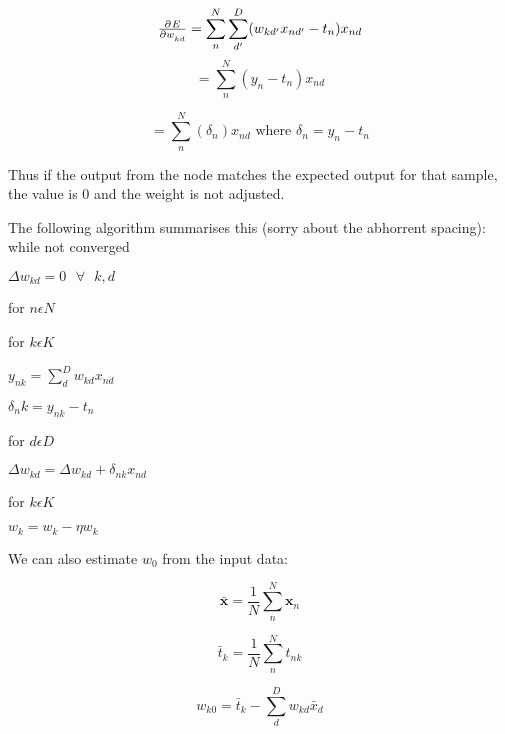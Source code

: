 \documentclass[10pt,a4paper]{article}
\newcommand{\su}[2]{\sum\limits_{#1}^{#2}}
\newcommand{\re}[1]{\frac{1}{#1}}
\begin{document}
	\begin{equation*}
		\pd{E}{w_{kd}} = \su{n}{N} \su{d'}{D}(w_{kd'}x_{nd'} - t_{n})x_{nd}
	\end{equation*}
	\begin{equation*}
		= \su{n}{N} (y_n - t_{n})x_{nd}
	\end{equation*}
	
	\begin{equation*}
		= \su{n}{N} (\delta_n)x_{nd} \text{  where  } \delta_n = y_n - t_n
	\end{equation*}
	
	Thus if the output from the node matches the expected output for that sample, the value is 0 and the weight is not adjusted.
	
	The following algorithm summarises this (sorry about the abhorrent spacing):\newline \newline
	\quad while not converged
	
	\quad \quad $\Delta w_{kd} = 0 \text{ } \forall \text{ }k,d$
	
	\quad \quad for $n \epsilon N$
	
	\quad \quad \quad for $k \epsilon K$
	
	\quad \quad \quad \quad $y_{nk} = \su{d}{D} w_{kd}x_{nd}$
	
	\quad \quad \quad \quad $\delta_nk = y_{nk} - t_n$
	
	\quad \quad \quad \quad for $d \epsilon D$

	\quad \quad \quad \quad \quad	$\Delta w_{kd} = \Delta w_{kd} + \delta_{nk}x_{nd} $
	
	\quad for $k \epsilon K$
	
	\quad \quad $ w_{k} = w_{k} - \eta w_k $
	\newline \newline \newline
	
	We can also estimate $w_0$ from the input data:
	
	
	\begin{equation*}
		\bar{\bm x} = \re{N} \su{n}{N} \bm x_n 
	\end{equation*}
	
	\begin{equation*}
		\bar{t}_k = \re{N} \su{n}{N} t_{nk}
	\end{equation*}
	
	\begin{equation*}
		w_{k0} = \bar t_k - \su{d}{D} w_{kd}\bar x_d
	\end{equation*}
	
\end{document}
